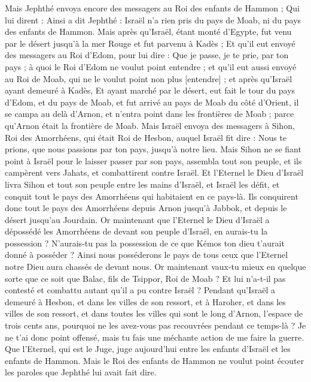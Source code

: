 \begin{multicols}{2}
Mais Jephthé envoya encore des messagers au Roi des enfants de Hammon ;
Qui lui dirent : Ainsi a dit Jephthé : Israël n'a rien pris du pays de Moab, ni du pays des enfants de Hammon.
Mais après qu'Israël, étant monté d'Egypte, fut venu par le désert jusqu'à la mer Rouge et fut parvenu à Kadès ;
Et qu'il eut envoyé des messagers au Roi d'Edom, pour lui dire : Que je passe, je te prie, par ton pays ; à quoi le Roi d'Edom ne voulut point entendre ; et qu'il eut aussi envoyé au Roi de Moab, qui ne le voulut point non plus [entendre] ; et après qu'Israël ayant demeuré à Kadès,
Et ayant marché par le désert, eut fait le tour du pays d'Edom, et du pays de Moab, et fut arrivé au pays de Moab du côté d'Orient, il se campa au delà d'Arnon, et n'entra point dans les frontières de Moab ; parce qu'Arnon était la frontière de Moab.
Mais Israël envoya des messagers à Sihon, Roi des Amorrhéens, qui était Roi de Hesbon, auquel Israël fit dire : Nous te prions, que nous passions par ton pays, jusqu'à notre lieu.
Mais Sihon ne se fiant point à Israël pour le laisser passer par son pays, assembla tout son peuple, et ils campèrent vers Jahats, et combattirent contre Israël.
Et l'Eternel le Dieu d'Israël livra Sihon et tout son peuple entre les mains d'Israël, et Israël les défit, et conquit tout le pays des Amorrhéens qui habitaient en ce pays-là.
Ils conquirent donc tout le pays des Amorrhéens depuis Arnon jusqu'à Jabbok, et depuis le désert jusqu'au Jourdain.
Or maintenant que l'Eternel le Dieu d'Israël a dépossédé les Amorrhéens de devant son peuple d'Israël, en aurais-tu la possession ?
N'aurais-tu pas la possession de ce que Kémos ton dieu t'aurait donné à posséder ? Ainsi nous posséderons le pays de tous ceux que l'Eternel notre Dieu aura chassés de devant nous.
Or maintenant vaux-tu mieux en quelque sorte que ce soit que Balac, fils de Tsippor, Roi de Moab ? Et lui n'a-t-il pas contesté et combattu autant qu'il a pu contre Israël ?
Pendant qu'Israël a demeuré à Hesbon, et dans les villes de son ressort, et à Haroher, et dans les villes de son ressort, et dans toutes les villes qui sont le long d'Arnon, l'espace de trois cents ans, pourquoi ne les avez-vous pas recouvrées pendant ce temps-là ?
Je ne t'ai donc point offensé, mais tu fais une méchante action de me faire la guerre. Que l'Eternel, qui est le Juge, juge aujourd'hui entre les enfants d'Israël et les enfants de Hammon.
Mais le Roi des enfants de Hammon ne voulut point écouter les paroles que Jephthé lui avait fait dire.

\end{multicols}
